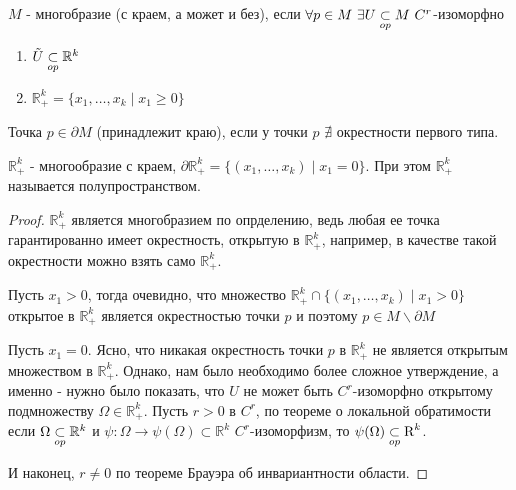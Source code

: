\newpage
\begin{definition}
    $M$ - многобразие (с краем, а может и без), если $\forall p \in M \ \exists U \open M \ C^r$-изоморфно 
    \begin{enumerate}
        \item $\tilde{U} \underset{op}{\subset} \mathbb{R}^k$
        \item $\mathbb{R}^k_+ = \{x_1, \hdots, x_k \mid x_1 \geq 0\}$ 
    \end{enumerate}
\end{definition}

\begin{definition}
    Точка $p \in \partial M$ (принадлежит краю), если у точки $p$ $\nexists$ окрестности первого типа.
\end{definition}

\begin{lemma*}
    $\mathbb{R}^k_+$ - многообразие с краем, $\partial \mathbb{R}^k_+ = \{(x_1, \hdots, x_k) \mid x_1 = 0\}$. При этом $\mathbb{R}^k_+$ называется полупространством.
    \begin{proof}
        $\mathbb{R}^k_+$ является многобразием по опрделению, ведь любая ее точка гарантированно имеет окрестность, открытую в $\mathbb{R}^k_+$, например, в качестве такой окрестности можно взять само $\mathbb{R}^k_+$.
        \par
        Пусть $x_1 > 0$, тогда очевидно, что множество $\mathbb{R}^k_+ \cap \{(x_1, \hdots, x_k) \mid x_1 > 0\}$ открытое в $\mathbb{R}^k_+$ является окрестностью точки $p$ и поэтому $p \in M \backslash \partial M$
        \par
        Пусть $x_1 = 0$. Ясно, что никакая окрестность точки $p$ в $\mathbb{R}^k_+$ не является открытым множеством в $\mathbb{R}^k_+$.
        Однако, нам было необходимо более сложное утверждение, а именно - нужно было показать, что $U$ не может быть $C^r$-изоморфно открытому подмножеству $\Omega \in \mathbb{R}^k_+$. 
        Пусть $r > 0$ в $C^r$, по теореме о локальной обратимости если $\Omega \underset{op}{\subset} \mathbb{R}^k$ и $\psi: \Omega \to \psi(\Omega) \subset \mathbb{R}^k$ $C^r$-изоморфизм, то $\psi(\Omega) \underset{op}{\subset} \mbox{R}^k$.
        \par
        И наконец, $r \neq 0$ по теореме Брауэра об инвариантности области.
    \end{proof}
\end{lemma*}

